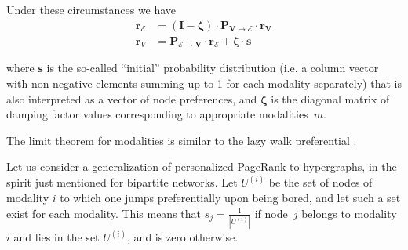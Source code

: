 \documentclass{fundam}
\newcommand{\HEM}{\mathcal{E}}
\newcommand{\N}{ V }
\newcommand{\Zeta}{\boldsymbol\zeta}
\begin{document}
\medskip
Under these circumstances we have
\begin{equation} \label{eq:rdef}
\begin{split}
\mathbf{r}_{\HEM} &=(\mathbf{I}-\Zeta){\cdot} \mathbf{P_{\N\rightarrow \HEM}}{\cdot}\mathbf{r_\N} \\
\mathbf{r}_{\N} &= \mathbf{P_{\HEM\rightarrow \N}}{\cdot}\mathbf{r_{\HEM}}
+ \Zeta {\cdot} \mathbf{s}
\end{split}
\end{equation}

\noindent where $\mathbf{s}$ is the so-called ``initial'' probability distribution (i.e. a column vector with non-negative elements summing up to 1 for each modality separately) that is also interpreted as a vector of node preferences, and $\Zeta$ is the diagonal matrix of damping factor values corresponding to appropriate modalities~$m$.

The limit theorem for modalities is similar to
the lazy walk preferential
\cite[Theorem 2]{Bipartite:2016}.

Let us consider a generalization of personalized PageRank to hyper{}graphs, in the spirit just mentioned for bipartite networks. Let $U^{(i)}$ be the set of nodes of modality $i$ to which one jumps preferentially upon being bored, and let such a set exist for each modality.
This means that $s_j=\frac{1}{|U^{(i)}|}$ if node~$j$ belongs to modality $i$ and lies in the set $U^{(i)}$, and is zero otherwise.
\end{document}
